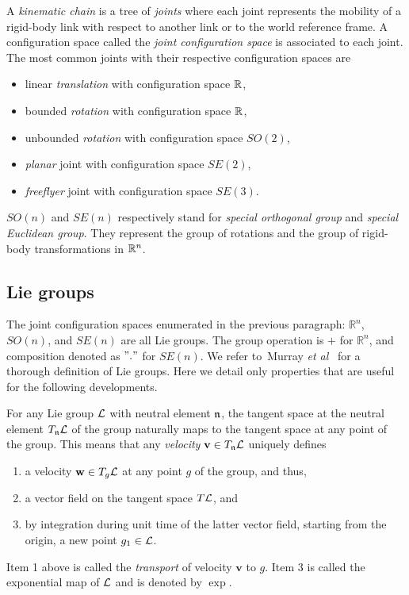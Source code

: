 A \textit{kinematic chain} is a tree of \textit{joints} where each
joint represents the mobility of a rigid-body link with respect to
another link or to the world reference frame.
A configuration space called the \textit{joint configuration space} is
associated to each joint.
The most common joints with their respective configuration spaces are
\begin{itemize}
\item linear \textit{translation} with configuration space $\mathbb{R}$,
\item bounded \textit{rotation} with configuration space  $\mathbb{R}$,
\item unbounded \textit{rotation} with configuration space  $SO(2)$,
\item \textit{planar} joint with configuration space $SE(2)$,
\item \textit{freeflyer} joint with configuration space $SE(3)$.
\end{itemize}
$SO(n)$ and $SE(n)$ respectively stand for \textit{special orthogonal group} and \textit{special Euclidean group}. They represent the group of rotations and the group of rigid-body transformations in $\mathbb{R}^n$.

\subsection{Lie groups}

The joint configuration spaces enumerated in the previous paragraph: $\mathbb{R}^n$, $SO(n)$, and $SE(n)$ are all Lie groups. The group operation is $+$ for $\mathbb{R}^n$, and composition denoted as $"."$ for $SE(n)$. We refer to~{\color{blue}Murray \textit{et al}}~\cite[Appendix A]{LMS94} for a thorough definition of Lie groups. Here we detail only properties that are useful for the following developments.

For any Lie group $\mathcal{L}$ with neutral element $\mathfrak{n}$, the tangent space at the neutral element $T_{\mathfrak{n}}\mathcal{L}$ of the group naturally maps to the tangent space at any point of the group. This means that any \textit{velocity} $\mathbf{v}\in T_{\mathfrak{n}}\mathcal{L}$ uniquely defines
\begin{enumerate}
\item a velocity $\mathbf{w}\in T_{g}\mathcal{L}$ at any point $g$ of the group, and thus,
\item a vector field on the tangent space $T\mathcal{L}$, and
\item by integration during unit time of the latter vector field, starting from the origin, a new point $g_{1}\in\mathcal{L}$.
\end{enumerate}
Item 1 above is called the \textit{transport} of velocity $\mathbf{v}$ to $g$.
Item 3 is called the exponential map of $\mathcal{L}$ and is denoted by $\exp$.

